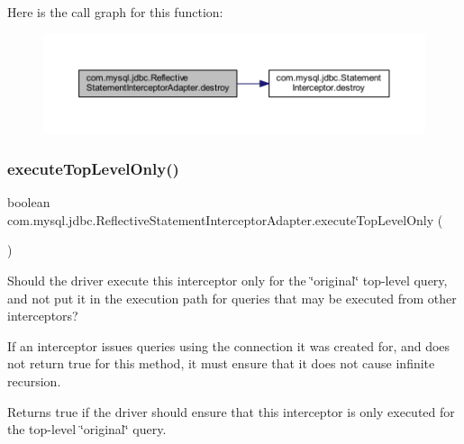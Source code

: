 Here is the call graph for this function\+:
\nopagebreak
\begin{figure}[H]
\begin{center}
\leavevmode
\includegraphics[width=350pt]{classcom_1_1mysql_1_1jdbc_1_1_reflective_statement_interceptor_adapter_aa04ad6c4f60c2b7339f5dcb07ba9407a_cgraph}
\end{center}
\end{figure}
\mbox{\label{classcom_1_1mysql_1_1jdbc_1_1_reflective_statement_interceptor_adapter_abe31396aeda856d1ef66a90f95b3d3c0}} 
\subsubsection{\texorpdfstring{execute\+Top\+Level\+Only()}{executeTopLevelOnly()}}
{\footnotesize\ttfamily boolean com.\+mysql.\+jdbc.\+Reflective\+Statement\+Interceptor\+Adapter.\+execute\+Top\+Level\+Only (\begin{DoxyParamCaption}{ }\end{DoxyParamCaption})}

Should the driver execute this interceptor only for the \char`\"{}original\char`\"{} top-\/level query, and not put it in the execution path for queries that may be executed from other interceptors?

If an interceptor issues queries using the connection it was created for, and does not return {\ttfamily true} for this method, it must ensure that it does not cause infinite recursion.

\begin{DoxyReturn}{Returns}
true if the driver should ensure that this interceptor is only executed for the top-\/level \char`\"{}original\char`\"{} query. 
\end{DoxyReturn}


